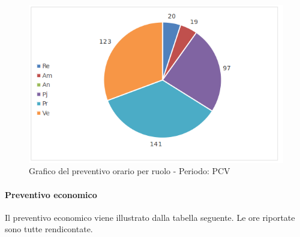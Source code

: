 			\begin{figure}[H]
			\centering
			\includegraphics[scale=0.42]{img/h_r_PCV}
			\caption{Grafico del preventivo orario per ruolo - Periodo: PCV}
			\label{fig:h_r_PCV"}
			\end{figure}

			\newpage
			\paragraph{Preventivo economico}
			Il preventivo economico viene illustrato dalla tabella seguente. Le ore riportate sono tutte rendicontate.\\

